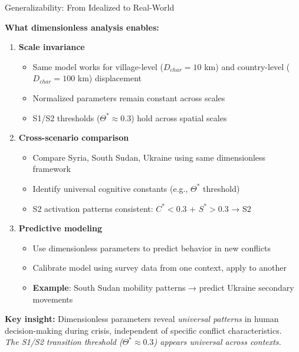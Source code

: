 \documentclass[aspectratio=169]{beamer}
\begin{document}
\begin{frame}{Generalizability: From Idealized to Real-World}

\textbf{What dimensionless analysis enables:}

\begin{enumerate}
    \item \textbf{Scale invariance}
    \begin{itemize}
        \item Same model works for village-level ($D_{char} = 10$ km) and country-level ($D_{char} = 100$ km) displacement
        \item Normalized parameters remain constant across scales
        \item S1/S2 thresholds ($\Theta^* \approx 0.3$) hold across spatial scales
    \end{itemize}
    
    \item \textbf{Cross-scenario comparison}
    \begin{itemize}
        \item Compare Syria, South Sudan, Ukraine using same dimensionless framework
        \item Identify universal cognitive constants (e.g., $\Theta^*$ threshold)
        \item S2 activation patterns consistent: $C^* < 0.3$ + $S^* > 0.3$ → S2
    \end{itemize}
    
    \item \textbf{Predictive modeling}
    \begin{itemize}
        \item Use dimensionless parameters to predict behavior in new conflicts
        \item Calibrate model using survey data from one context, apply to another
        \item \textbf{Example}: South Sudan mobility patterns → predict Ukraine secondary movements
    \end{itemize}
\end{enumerate}

\vspace{0.5em}

\textbf{Key insight:} Dimensionless parameters reveal \textit{universal patterns} in human decision-making during crisis, independent of specific conflict characteristics.\\
\textit{The S1/S2 transition threshold ($\Theta^* \approx 0.3$) appears universal across contexts.}

\end{frame}
\end{document}
